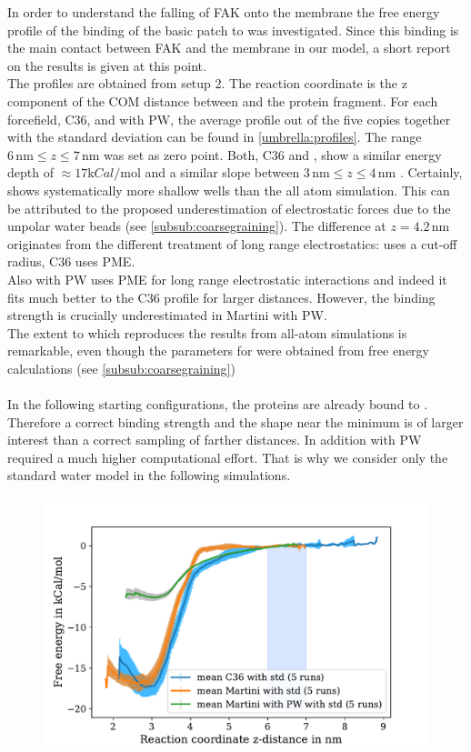 \label{results:umbrella}
In order to understand the falling of FAK onto the membrane the free energy profile of the binding of the basic patch to \pip{} was investigated. Since this binding is the main contact between FAK and the membrane in our model, a short report on the results is given at this point.\\
The profiles are obtained from setup 2. The reaction coordinate is the z component of the COM distance between \pip{} and the protein fragment. For each forcefield, C36, \martini{} and \martini{} with PW, the average profile out of the five copies together with the standard deviation can be found in \autoref{umbrella:profiles}. The range $6\,\si{\nano\metre} \le z \le 7\,\si{\nano\metre}$ was set as zero point.
Both, C36 and \martini{}, show a similar energy depth of $\approx 17 \si{\kilo Cal/\mole}$ and a similar slope between $3\,\si{\nano\metre} \le z \le 4\,\si{\nano\metre}$ . Certainly, \martini{} shows systematically more shallow wells than the all atom simulation. This can be attributed to the proposed underestimation of electrostatic forces due to the unpolar water beads (see \autoref{subsub:coarsegraining}). The difference at $z = 4.2\,\si{\nano\metre}$ originates from the different treatment of long range electrostatics: \martini{} uses a cut-off radius, C36 uses PME.\\ %
Also \martini{} with PW uses PME for long range electrostatic interactions and indeed it fits much better to the C36 profile for larger distances. However, the binding strength is crucially underestimated in Martini with PW.\\
The extent to which \martini{} reproduces the results from all-atom simulations is remarkable, even though the parameters for \martini{} were obtained from free energy calculations (see \autoref{subsub:coarsegraining})\\
\\
In the following starting configurations, the proteins are already bound to \pip{}. Therefore a correct binding strength and the shape near the minimum is of larger interest than a correct sampling of farther distances. In addition \martini{} with PW required a much higher computational effort. That is why we consider only the standard water model in the following simulations.
%
%
%
\begin{figure}
	\centering
	\includegraphics[width=.8\textwidth]{figures/results/umbrella}
	\label{umbrella:profiles}
\end{figure}
%
%
%